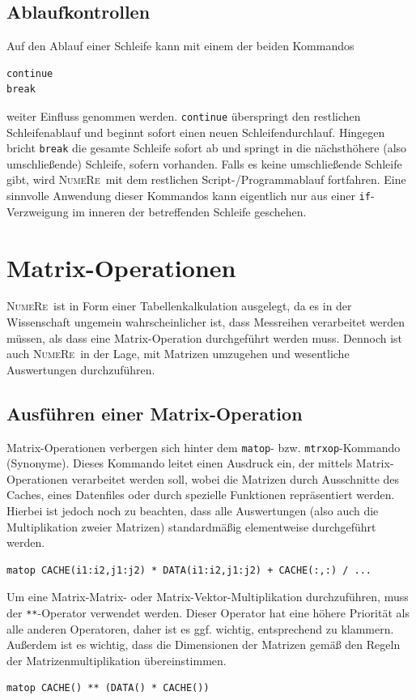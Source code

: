 \documentclass[DIV=14,headsepline,footsepline]{scrbook}
\newcommand{\NR}{\textsc{Nu\-me\-Re}}
\begin{document}
			\section{Ablaufkontrollen}
				Auf den Ablauf einer Schleife kann mit einem der beiden Kommandos
				\begin{lstlisting}
continue
break
				\end{lstlisting}
				weiter Einfluss genommen werden. \lstinline+continue+ überspringt den restlichen Schleifenablauf und beginnt sofort einen neuen Schleifendurchlauf. Hingegen bricht \lstinline+break+ die gesamte Schleife sofort ab und springt in die nächsthöhere (also umschließende) Schleife, sofern vorhanden. Falls es keine umschließende Schleife gibt, wird \NR\ mit dem restlichen Script-/Programmablauf fortfahren. Eine sinnvolle Anwendung dieser Kommandos kann eigentlich nur aus einer \lstinline+if+-Ver\-zwei\-gung im inneren der betreffenden Schleife geschehen.
				
		\chapter{Matrix-Operationen}
			\NR\ ist in Form einer Tabellenkalkulation ausgelegt, da es in der Wissenschaft ungemein wahrscheinlicher ist, dass Messreihen verarbeitet werden müssen, als dass eine Matrix-Operation durchgeführt werden muss. Dennoch ist auch \NR\ in der Lage, mit Matrizen umzugehen und wesentliche Auswertungen durchzuführen.
			\section{Ausführen einer Matrix-Operation}
				Matrix-Operationen verbergen sich hinter dem \lstinline+matop+- bzw. \lstinline+mtrxop+-Kommando (Synonyme). Dieses Kommando leitet einen Ausdruck ein, der mittels Matrix-Operationen verarbeitet werden soll, wobei die Matrizen durch Ausschnitte des Caches, eines Datenfiles oder durch spezielle Funktionen repräsentiert werden. Hierbei ist jedoch noch zu beachten, dass alle Auswertungen (also auch die Multiplikation zweier Matrizen) standardmäßig elementweise durchgeführt werden.
				\begin{lstlisting}
matop CACHE(i1:i2,j1:j2) * DATA(i1:i2,j1:j2) + CACHE(:,:) / ...
				\end{lstlisting}
				
				Um eine Matrix-Matrix- oder Matrix-Vektor-Multiplikation durchzuführen, muss der \lstinline+**+-O\-pe\-ra\-tor verwendet werden. Dieser Operator hat eine höhere Priorität als alle anderen Operatoren, daher ist es ggf. wichtig, entsprechend zu klammern. Außerdem ist es wichtig, dass die Dimensionen der Matrizen gemäß den Regeln der Matrizenmultiplikation übereinstimmen.
				\begin{lstlisting}
matop CACHE() ** (DATA() * CACHE())
				\end{lstlisting}
				
\end{document}
